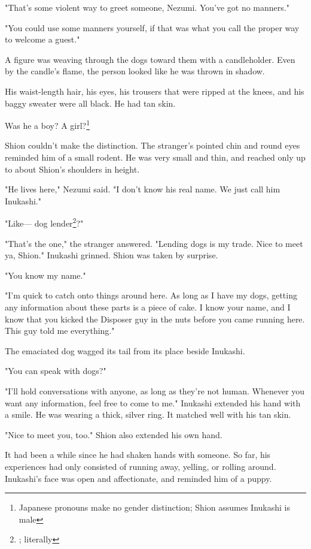 "That's some violent way to greet someone, Nezumi. You've got no
manners."

"You could use some manners yourself, if that was what you call the
proper way to welcome a guest."

A figure was weaving through the dogs toward them with a candleholder.
Even by the candle's flame, the person looked like he was thrown in
shadow.

His waist-length hair, his eyes, his trousers that were ripped at the
knees, and his baggy sweater were all black. He had tan skin.

Was he a boy? A girl?\footnote{Japanese pronouns make no gender distinction; Shion assumes Inukashi is male}

Shion couldn't make the distinction. The stranger's pointed chin and
round eyes reminded him of a small rodent. He was very small and thin,
and reached only up to about Shion's shoulders in height.

"He lives here," Nezumi said. "I don't know his real name. We just call
him Inukashi."

"Like--- dog lender\footnote{; literally}?"

"That's the one," the stranger answered. "Lending dogs is my trade. Nice
to meet ya, Shion." Inukashi grinned. Shion was taken by surprise.

"You know my name."

"I'm quick to catch onto things around here. As long as I have my dogs,
getting any information about these parts is a piece of cake. I know
your name, and I know that you kicked the Disposer guy in the nuts
before you came running here. This guy told me everything."

The emaciated dog wagged its tail from its place beside Inukashi.

"You can speak with dogs?"

"I'll hold conversations with anyone, as long as they're not human.
Whenever you want any information, feel free to come to me." Inukashi
extended his hand with a smile. He was wearing a thick, silver ring. It
matched well with his tan skin.

"Nice to meet you, too." Shion also extended his own hand.

It had been a while since he had shaken hands with someone. So far, his
experiences had only consisted of running away, yelling, or rolling
around. Inukashi's face was open and affectionate, and reminded him of a
puppy.

